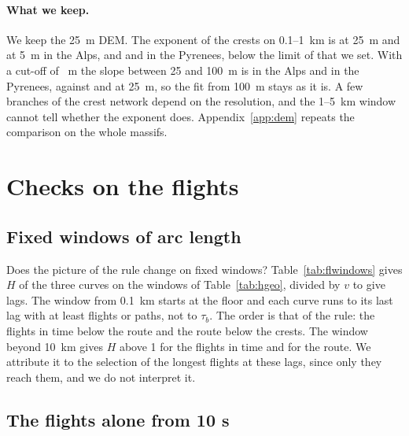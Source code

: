 \paragraph{What we keep.} We keep the 25~m DEM. The exponent of the crests on 0.1--1~km is \DrAlpsHLowA{} at 25~m and \DrAlpsHLowB{} at 5~m in the Alps, and \DrPyrHLowA{} and \DrPyrHLowB{} in the Pyrenees, below the limit of \DrKeep{} that we set. With a cut-off of \DrSmoothC~m the slope between 25 and 100~m is \DrAlpsHGridC{} in the Alps and \DrPyrHGridC{} in the Pyrenees, against \DrAlpsHGridA{} and \DrPyrHGridA{} at 25~m, so the fit from 100~m stays as it is. A few branches of the crest network depend on the resolution, and the 1--5~km window cannot tell whether the exponent does. Appendix~\ref{app:dem} repeats the comparison on the whole massifs.



\section{Checks on the flights}\label{app:checks}

\subsection{Fixed windows of arc length}\label{sec:flwindows}

Does the picture of the rule change on fixed windows? Table~\ref{tab:flwindows} gives $H$ of the three curves on the windows of Table~\ref{tab:hgeo}, divided by $v$ to give lags. The window from 0.1~km starts at the floor and each curve
runs to its last lag with at least \flMinRows{} flights or paths, not to $\tau_b$. The order is that of the rule: the flights in time below the route and the route below the crests. The window beyond 10~km gives $H$ above 1 for the flights in time
and for the route. We attribute it to the selection of the longest flights at these lags, since only they reach them, and we do not interpret it.

\begin{table}[H]
\centering
\caption{$H$ on fixed windows of arc length $s = v\tau$, with 95\% intervals.}
\label{tab:flwindows}
\footnotesize
\setlength{\tabcolsep}{3pt}

\end{table}

\subsection{The flights alone from 10 s}\label{sec:flhten}

